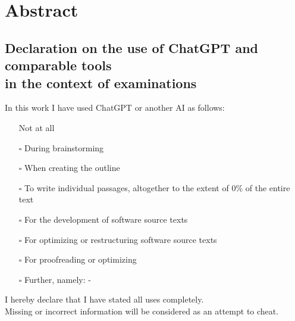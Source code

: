 \newcommand{\ccheckmark}{\mbox{\ooalign{$\checkmark$\cr\hidewidth$\square$\hidewidth\cr}}}
\newcommand{\ccheckbox}{\mbox{$\square$}}

\newcommand{\addemptypage}{\newpage\null\thispagestyle{empty}\newpage}

\titleformat{\section}[hang]{\huge\bfseries}{\thesection\hspace{20pt}}{0pt}{\huge\bfseries}
\graphicspath{{figures/}{./}{assets/}}




\fancyhead{}
\fancyhead[R]{\footnotesize \thesistitle}
\fancyfoot{}
\fancyfoot[R]{\thepage}
\fancyfoot[C]{\authorname}
\renewcommand{\headrulewidth}{0.4pt}
\renewcommand{\footrulewidth}{0.4pt}

\pagestyle{empty}
\hypersetup{pageanchor=false} %



\newpage
{}
\setcounter{page}{1}

\section*{Abstract}


\newpage

\vfill


\subsection*{Declaration on the use of ChatGPT and comparable tools\\ in the context of examinations}
\noindent In this work I have used ChatGPT or another AI as follows:
\begin{itemize}
	\item[\ccheckmark] Not at all
	\item[\ccheckbox] During brainstorming
	\item[\ccheckbox] When creating the outline
	\item[\ccheckbox] To write individual passages, altogether to the extent of 0\% of the entire text %
	\item[\ccheckbox] For the development of software source texts
	\item[\ccheckbox] For optimizing or restructuring software source texts
	\item[\ccheckbox] For proofreading or optimizing
	\item[\ccheckbox] Further, namely: - %
\end{itemize}
I hereby declare that I have stated all uses completely.\\
Missing or incorrect information will be considered as an attempt to cheat.

